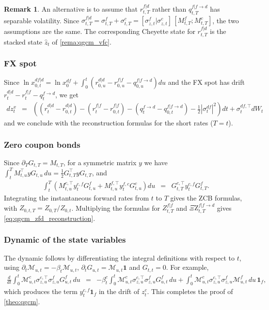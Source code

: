 \documentclass[11pt,english]{amsart}
\newcommand{\vun}{\mathbf{1}}
\newcommand{\QZ}{{\Xi\mathrm{Z}}}
\theoremstyle{definition}
\newtheorem{rema}{Remark}
\begin{document}
\begin{rema}
An alternative is to assume that $r^{f|d}_{t,T}$ rather than $q^{f|f\to d}_{t,T}$ has separable volatility. Since $\sigma^{f|d}_{t,T} = \sigma^{f}_{t,T} + \sigma^{c}_{t,T} = [\sigma^f_{z,t} | \sigma^c_{z,t}]\, [M^{f}_{t,T} ; M^c_{t,T}]$, the two assumptions are the same. The corresponding Cheyette state for $r^{f|d}_{t,T}$ is the stacked state $\hat{z}_t$ of \autoref{rema:qgcm_vfc}.
\end{rema}

\subsubsection{FX spot}
Since $\ln x^{df|d}_{0,t} = \ln x^{df}_0 + \int_0^t \left( r^{d|d}_{0,u} - r^{f|f}_{0,u} - q^{f|f\to d}_{0,u}\right) du$ and the FX spot has drift $r^{d|d}_t - r^{f|f}_t - q^{f\to d}_t$, we get
\begin{eqnarray*}
  dz^x_t &=& \left( (r^{d|d}_t - r^{d|d}_{0,t}) - (r^{f|f}_t - r^{f|f}_{0,t}) - (q^{f\to d}_t - q^{f|f\to d}_{0,t}) - \frac{1}{2}|\sigma^{df}_t|^2 \right)dt + \sigma^{df,\top}_t dW_t
\end{eqnarray*}
and we conclude with the reconstruction formulas for the short rates ($T = t$).

\subsubsection{Zero coupon bonds}
Since $\partial_T G_{t,T} = M_{t,T}$, for a symmetric matrix $y$ we have $\int_t^T M^\top_{t,u} y G_{t,u}\, du = \frac{1}{2}G_{t,T}^\top y G_{t,T}$, and
\begin{eqnarray*}
  \int_t^T \left( M^{c,\top}_{t,u} y^{c,f}_t G^f_{t,u} + M^{f,\top}_{t,u} y^{f,c}_t G^c_{t,u} \right) du &=& G^{c,\top}_{t,T} y^{c,f}_t G^f_{t,T} .
\end{eqnarray*}
Integrating the instantaneous forward rates from $t$ to $T$ gives the ZCB formulas, with $Z_{0,t,T} = Z_{0,T}/Z_{0,t}$. Multiplying the formulas for $Z^{f|f}_{t,T}$ and $\QZ^{f|f\to d}_{t,T}$ gives \eqref{eq:qgcm_zfd_reconstruction}.

\subsubsection{Dynamic of the state variables}
The dynamic follows by differentiating the integral definitions with respect to $t$, using $\partial_t \mathcal{M}_{u,t} = -\beta_t\mathcal{M}_{u,t}$, $\partial_t G_{u,t} = \mathcal{M}_{u,t}\vun$ and $G_{t,t}=0$. For example,
\begin{eqnarray*}
  \frac{d}{dt}\int_0^t \mathcal{M}^c_{u,t}\sigma^{c,\top}_{z,u}\sigma^f_{z,u} G^f_{u,t}\, du
  &=& -\beta^c_t \int_0^t \mathcal{M}^c_{u,t}\sigma^{c,\top}_{z,u}\sigma^f_{z,u} G^f_{u,t}\, du + \int_0^t \mathcal{M}^c_{u,t}\sigma^{c,\top}_{z,u}\sigma^f_{z,u} \mathcal{M}^f_{u,t}\, du \, \vun_f ,
\end{eqnarray*}
which produces the term $y^{c,f}_t\vun_f$ in the drift of $z^c_t$. This completes the proof of \autoref{theo:qgcm}.
\end{document}
